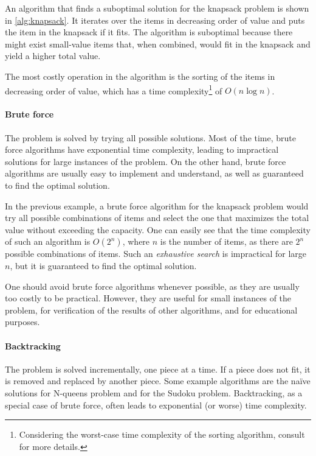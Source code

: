 An algorithm that finds a suboptimal solution for the knapsack problem is shown in
\cref{alg:knapsack}.
It iterates over the items in decreasing order of value and puts the item in the
knapsack if it fits.  The algorithm is suboptimal because there might exist small-value
items that, when combined, would fit in the knapsack and yield a higher total value.

The most costly operation in the algorithm is the sorting of the items in
decreasing order of value, which has a time complexity\footnote{%
Considering the worst-case time complexity of the sorting algorithm, consult
\textcite{Cormen2022} for more details.} of $O(n \log n)$.

\paragraph{Brute force}  The problem is solved by trying all possible solutions.  Most of
the time, brute force algorithms have exponential time complexity, leading to impractical
solutions for large instances of the problem.  On the other hand, brute force algorithms
are usually easy to implement and understand, as well as guaranteed to find the optimal
solution.

In the previous example, a brute force algorithm for the knapsack problem would
try all possible combinations of items and select the one that maximizes the total value
without exceeding the capacity.  One can easily see that the time complexity of such an
algorithm is $O(2^n)$, where $n$ is the number of items, as there are $2^n$ possible
combinations of items.  Such an \emph{exhaustive search} is impractical for large $n$,
but it is guaranteed to find the optimal solution.

One should avoid brute force algorithms whenever possible, as they are usually too costly
to be practical.  However, they are useful for small instances of the problem, for
verification of the results of other algorithms, and for educational purposes.

\paragraph{Backtracking}  The problem is solved incrementally, one piece at a time.  If a
piece does not fit, it is removed and replaced by another piece.  Some example algorithms
are the naïve solutions for N-queens problem and for the Sudoku problem.  Backtracking, as
a special case of brute force, often leads to exponential (or worse) time complexity.

